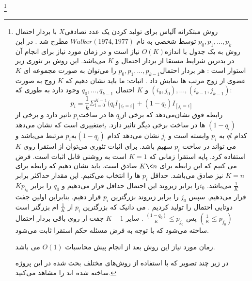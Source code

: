 \footnote{
  روش مبتکرانه آلیاس برای تولید کردن یک عدد تصادفی$X$ با  بردار احتمال$ p_{0}, p_{1}, ..., p_{k}$   توسط شخصی به نام $Walker(1974,1977)$ مطرح شد   . در این روش به یک جدول با اندازه$ O(K)$  نیاز است و در زمان مورد نیاز برای انجام آن در بدترین شرایط مستقا از بردار احتمال و $K$ می‌باشد.  
 این روش بر تئوری زیر استوار است :
هر بردار احتمال$ p_{0}, p_{1} , ..., p_{k -1}$  را می‌توان به صورت مجموعه ای $K$ عضوی از زوج مرتب ها نمایش داد . 
اثبات:
ما باید نشان دهیم که $K$  زوج به صورت $(i_{0}, j_{0}),...,(i_{k-1},j_{k-1})$  و $K$ احتمال $q_{0},...,q_{k-1}$ وجود دارد به طوری که:
\begin{equation}
p_{i} = \frac{1}{k}\Sigma_{l = 0} ^{K-1}(q_{l}I_{[i_{l} =i]}+(1-q_{l})I_{[j_{l} =i]}


\end{equation} 
رابطه فوق نشان‌می‌دهد که برخی از$q_{l}$ ها در ساخت$ p_{i}$ تاثیر دارد و برخی از $(1-q_{l}) $  ها در ساخت برخی دیگر تاثیر دارد. $i_{l}$متغییری  است که نشان می‌دهد کدام $q{l}$ به $p_{i}$ وابسته است و $j_{l}$ نشان می‌دهد کدام $(1-q_{l}) $به$p_{i}$ مرتبط می‌باشد و می تواند در ساخت $p_{i}$ سهیم باشد. 
  برای اثبات تئوری می‌توان از استقرا روی $K$ استفاده کرد. پایه استقرا زمانی که $K = 1$ است به روشنی قابل اثبات است. فرض می کنیم که این رابطه برای $K\< n$ صادق است. باید نشان دهیم که رابطه برای $K=n$ نیز صادق می‌باشد. حداقل $p_{i}$ ها را انتخاب می‌کنیم. این مقدار حداکثر برابر $\frac{1}{K}$ می‌باشد.  $i_{0}$را برابر زیروند این احتمال حداقل قرار می‌دهیم و $q_{0}$ را برابر $Kp_{i_{0}}$ قرار می‌دهیم. سپس $j_{0} $ را برابر زیروند بزرگترین $p_{i}$ قرار دهیم. بنابراین اولین جفت دوتایی احتمال را تولید کردیم . می دانیک که بزرگترین $p_{i}$ از $\frac{1}{K}$ ام بزرگتر است $(\frac{1}{K	}\leq p_{j_{0}})$ پس $\frac{(1-q_{0})}{K}\leq p_{j_{0}}$ .  سایر $K-1$ جفت ار روی باقی بردار احتمال ساخته می‌شود که با توجه به فرض مسئله حکم استقرا ثابت می‌شود.
 
 
  

 زمان مورد نیاز این روش  بعد از  انجام پیش محاسبات $ O(1)$ می باشد.

در زیر چند تصویر که با استفاده از روش‌های مختلف بحث شده در این پروژه ساخته شده اند را مشاهد می‌کنید.

}
